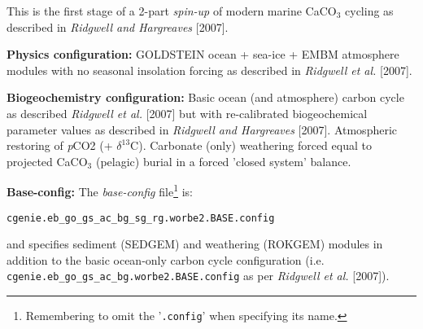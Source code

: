 \documentclass[10pt,twoside]{article}
\begin{document}
This is the first stage of a 2-part \textsl{spin-up} of modern marine CaCO$_{3}$ cycling as described in \textit{Ridgwell and Hargreaves} [2007].

\noindent \textbf{Physics configuration:} GOLDSTEIN ocean + sea-ice + EMBM atmosphere modules with no seasonal insolation forcing as described in \textit{Ridgwell et al.} [2007].

\noindent \textbf{Biogeochemistry configuration:} Basic ocean (and atmosphere) carbon cycle as described \textit{Ridgwell et al.} [2007] but with re-calibrated biogeochemical parameter values as described in \textit{Ridgwell and Hargreaves} [2007]. Atmospheric restoring of \textit{p}CO2 (+ $\delta^{13}$C). Carbonate (only) weathering forced equal to projected CaCO$_{3}$ (pelagic) burial in a forced 'closed system' balance.

\noindent \textbf{Base-config:} The \textit{base-config} file\footnote{Remembering to omit the '\texttt{.config}' when specifying its name.} is:
\vspace{-10pt}\begin{verbatim}cgenie.eb_go_gs_ac_bg_sg_rg.worbe2.BASE.config\end{verbatim}\vspace{-10pt}
and specifies sediment (SEDGEM) and weathering (ROKGEM) modules in addition to the basic ocean-only carbon cycle configuration (i.e. \texttt{cgenie.eb\_go\_gs\_ac\_bg.worbe2.BASE.config} as per \textit{Ridgwell et al.} [2007]).
\end{document}
